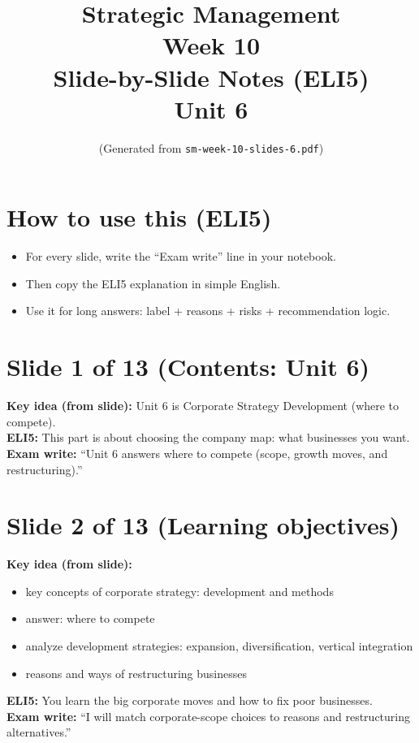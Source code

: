 \documentclass[11pt,a4paper]{article}
\title{Strategic Management \\ Week 10 \\ Slide-by-Slide Notes (ELI5) \\ Unit 6}
\author{(Generated from \texttt{sm-week-10-slides-6.pdf})}
\date{}
\begin{document}
\maketitle

\section*{How to use this (ELI5)}
\begin{itemize}
  \item For every slide, write the ``Exam write'' line in your notebook.
  \item Then copy the ELI5 explanation in simple English.
  \item Use it for long answers: label + reasons + risks + recommendation logic.
\end{itemize}

\section*{Slide 1 of 13 (Contents: Unit 6)}
\textbf{Key idea (from slide):} Unit 6 is Corporate Strategy Development (where to compete).\\
\textbf{ELI5:} This part is about choosing the company map: what businesses you want.\\
\textbf{Exam write:} ``Unit 6 answers where to compete (scope, growth moves, and restructuring).''

\section*{Slide 2 of 13 (Learning objectives)}
\textbf{Key idea (from slide):}
\begin{itemize}
  \item key concepts of corporate strategy: development and methods
  \item answer: where to compete
  \item analyze development strategies: expansion, diversification, vertical integration
  \item reasons and ways of restructuring businesses
\end{itemize}
\textbf{ELI5:} You learn the big corporate moves and how to fix poor businesses.\\
\textbf{Exam write:} ``I will match corporate-scope choices to reasons and restructuring alternatives.''

\end{document}
